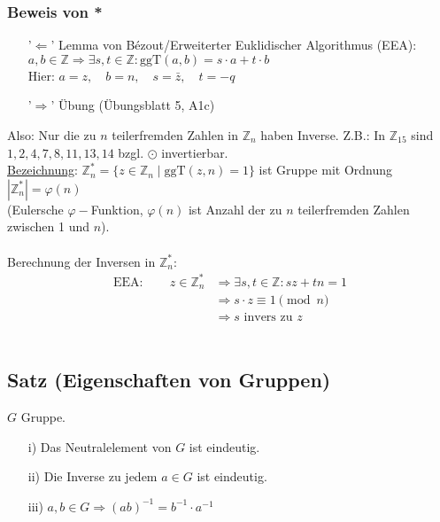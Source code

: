 \documentclass[a4paper, 12pt,titlepage, pdf, headsepline]{article}
\newcommand{\uline}[1]{\underline{#1}}
\renewcommand{\>}{\rightarrow}
\renewcommand{\*}{\cdot}
\renewcommand{\phi}{\varphi}
\begin{document}
	      \subsubsection*{Beweis von *}
	      \begin{itemize}
	      	\item['$\Leftarrow$'] Lemma von Bézout/Erweiterter Euklidischer Algorithmus (EEA): \\
	      	      $a,b \in \mathds{Z} \Rightarrow \exists s,t \in \mathds{Z}: \text{ggT}(a,b)= s \cdot a + t \cdot b$\\
	      	      Hier: $a = z,\quad b = n,\quad s = \bar{z},\quad t = -q$
	      	\item['$\Rightarrow$'] Übung (Übungsblatt 5, A1c)
	      \end{itemize}
	      Also: Nur die zu $n$ teilerfremden Zahlen in $\mathds{Z}_n$ haben Inverse. Z.B.: In $\mathds{Z}_{15}$ sind $1,2,4,7,8,11,13,14$ bzgl. $\odot$ invertierbar. \\
	      \uline{Bezeichnung}: $\mathds{Z}^*_n = \{z \in \mathds{Z}_n \mid \text{ggT}(z,n)= 1\}$ ist Gruppe mit Ordnung $| \mathds{Z}^*_n | = \phi(n)$\\
	      (Eulersche $\phi-$Funktion, $\phi(n)$ ist Anzahl der zu $n$ teilerfremden Zahlen zwischen 1 und $n$).\\
	      \\
	      Berechnung der Inversen in $\mathds{Z}^*_n$: 
	      \begin{align*}		
	      	\text{EEA}:\qquad z \in \mathds{Z}^*_n & \Rightarrow \exists s,t \in \mathds{Z}: sz + tn = 1 \\
	      	                                       & \Rightarrow s \cdot z \equiv 1 \pmod{n}             \\
	      	                                       & \Rightarrow s \text{ invers zu } z                  
	      \end{align*}\\
	      \subsection{Satz (Eigenschaften von Gruppen)} 
	      \label{3.13}
	      $G$ Gruppe.
	      \begin{itemize}
	      	\item[i)] Das Neutralelement von $G$ ist eindeutig. 
	      	\item[ii)] Die Inverse zu jedem $a \in G$ ist eindeutig.
	      	\item[iii)] $a,b \in G \Rightarrow (ab)^{-1} = b^{-1} \cdot a^{-1}$
	      \end{itemize}
\end{document}
